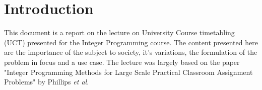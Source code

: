 \section{Introduction}

This document is a report on the lecture on University Course timetabling (UCT) presented for the Integer Programming course. The content presented here are the importance of the subject to society, it's variations, the formulation of the problem in focus and a use case. The lecture was largely based on the paper "Integer Programming Methods for Large Scale Practical Classroom Assignment Problems" by Phillips \emph{et al}.

